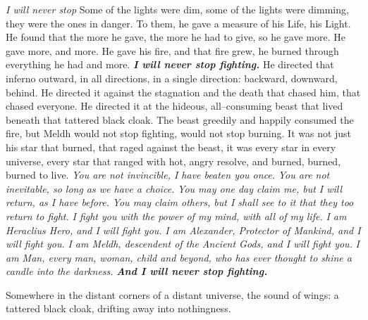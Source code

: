 \SmallVSpace
\emph{I will never stop{\el}}
\SmallVSpace
Some of the lights were dim, some of the lights were dimming, they were the ones in danger. To them, he gave a measure of his Life, his Light. He found that the more he gave, the more he had to give, so he gave more. He gave more, and more. He gave his fire, and that fire grew, he burned through everything he had and more.
\SmallVSpace
\textbf{\emph{I will never stop fighting.}}
\SmallVSpace
He directed that inferno outward, in all directions, in a single direction: backward, downward, behind. He directed it against the stagnation and the death that chased him, that chased everyone. He directed it at the hideous, all\mbox{--}consuming beast that lived beneath that tattered black cloak. The beast greedily and happily consumed the fire, but Meldh would not stop fighting, would not stop burning.
\SmallVSpace
It was not just his star that burned, that raged against the beast, it was every star in every universe, every star that ranged with hot, angry resolve, and burned, burned, burned to live.
\SmallVSpace
\textit{\newline You are not invincible, I have beaten you once.}%
\textit{\newline You are not inevitable, so long as we have a choice.}\SmallVSpace
\textit{\newline You may one day claim me, but I will return, as I have before.}
\textit{\newline You may claim others, but I shall see to it that they too return to fight.}
\textit{\newline I fight you with the power of my mind, with all of my life.}\SmallVSpace
\textit{\newline I am Heraclius Hero, and I will fight you.}
\textit{\newline I am Alexander, Protector of Mankind, and I will fight you.}
\textit{\newline I am Meldh, descendent of the Ancient Gods, and I will fight you.}
\textit{\newline I am Man, every man, woman, child and beyond, who has ever thought to shine a candle into the darkness.
}
\SmallVSpace
\textbf{\newline\emph{And I will never stop fighting.}}
\simpleline
\begin{flushright}
Somewhere in the distant corners of a distant universe, the sound of wings: a tattered black cloak, drifting away into nothingness.
\end{flushright}